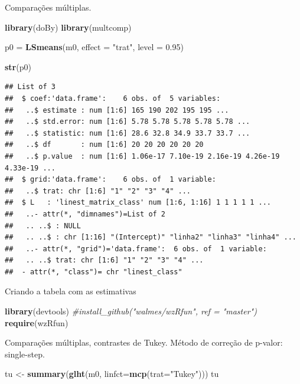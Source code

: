 \documentclass[
]{book}
\newenvironment{Shaded}{\begin{snugshade}}{\end{snugshade}}
\newcommand{\CommentTok}[1]{\textcolor[rgb]{0.56,0.35,0.01}{\textit{#1}}}
\newcommand{\DataTypeTok}[1]{\textcolor[rgb]{0.13,0.29,0.53}{#1}}
\newcommand{\FloatTok}[1]{\textcolor[rgb]{0.00,0.00,0.81}{#1}}
\newcommand{\KeywordTok}[1]{\textcolor[rgb]{0.13,0.29,0.53}{\textbf{#1}}}
\newcommand{\NormalTok}[1]{#1}
\newcommand{\StringTok}[1]{\textcolor[rgb]{0.31,0.60,0.02}{#1}}
\begin{document}
Comparações múltiplas.

\begin{Shaded}
\begin{Highlighting}[]
\KeywordTok{library}\NormalTok{(doBy) }
\KeywordTok{library}\NormalTok{(multcomp) }

\NormalTok{p0 =}\StringTok{ }\KeywordTok{LSmeans}\NormalTok{(m0, }\DataTypeTok{effect =} \StringTok{"trat"}\NormalTok{, }\DataTypeTok{level =} \FloatTok{0.95}\NormalTok{) }

\KeywordTok{str}\NormalTok{(p0)}
\end{Highlighting}
\end{Shaded}

\begin{verbatim}
## List of 3
##  $ coef:'data.frame':    6 obs. of  5 variables:
##   ..$ estimate : num [1:6] 165 190 202 195 195 ...
##   ..$ std.error: num [1:6] 5.78 5.78 5.78 5.78 5.78 ...
##   ..$ statistic: num [1:6] 28.6 32.8 34.9 33.7 33.7 ...
##   ..$ df       : num [1:6] 20 20 20 20 20 20
##   ..$ p.value  : num [1:6] 1.06e-17 7.10e-19 2.16e-19 4.26e-19 4.33e-19 ...
##  $ grid:'data.frame':    6 obs. of  1 variable:
##   ..$ trat: chr [1:6] "1" "2" "3" "4" ...
##  $ L   : 'linest_matrix_class' num [1:6, 1:16] 1 1 1 1 1 ...
##   ..- attr(*, "dimnames")=List of 2
##   .. ..$ : NULL
##   .. ..$ : chr [1:16] "(Intercept)" "linha2" "linha3" "linha4" ...
##   ..- attr(*, "grid")='data.frame':  6 obs. of  1 variable:
##   .. ..$ trat: chr [1:6] "1" "2" "3" "4" ...
##  - attr(*, "class")= chr "linest_class"
\end{verbatim}

Criando a tabela com as estimativas

\begin{Shaded}
\begin{Highlighting}[]
\KeywordTok{library}\NormalTok{(devtools) }
\CommentTok{#install_github("walmes/wzRfun", ref = "master") }
\KeywordTok{require}\NormalTok{(wzRfun)}
\end{Highlighting}
\end{Shaded}

Comparações múltiplas, contrastes de Tukey. Método de correção de p-valor: single-step.

\begin{Shaded}
\begin{Highlighting}[]
\NormalTok{tu <-}\StringTok{ }\KeywordTok{summary}\NormalTok{(}\KeywordTok{glht}\NormalTok{(m0, }\DataTypeTok{linfct=}\KeywordTok{mcp}\NormalTok{(}\DataTypeTok{trat=}\StringTok{"Tukey"}\NormalTok{))) }
\NormalTok{tu}
\end{Highlighting}
\end{Shaded}
\end{document}
